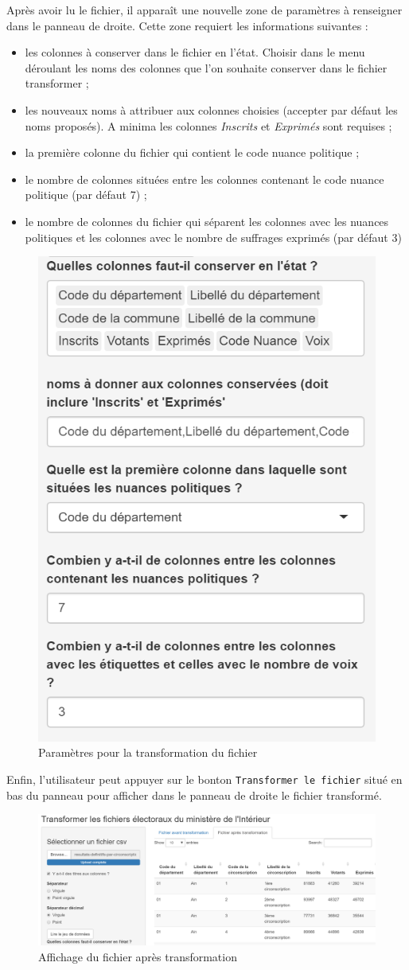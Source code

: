 \documentclass[
]{article}
\providecommand{\tightlist}{%
  \setlength{\itemsep}{0pt}\setlength{\parskip}{0pt}}
\begin{document}
Après avoir lu le fichier, il apparaît une nouvelle zone de paramètres à
renseigner dans le panneau de droite. Cette zone requiert les
informations suivantes :

\begin{itemize}
\tightlist
\item
  les colonnes à conserver dans le fichier en l'état. Choisir dans le
  menu déroulant les noms des colonnes que l'on souhaite conserver dans
  le fichier transformer ;
\item
  les nouveaux noms à attribuer aux colonnes choisies (accepter par
  défaut les noms proposés). A minima les colonnes \emph{Inscrits} et
  \emph{Exprimés} sont requises ;
\item
  la première colonne du fichier qui contient le code nuance politique ;
\item
  le nombre de colonnes situées entre les colonnes contenant le code
  nuance politique (par défaut 7) ;
\item
  le nombre de colonnes du fichier qui séparent les colonnes avec les
  nuances politiques et les colonnes avec le nombre de suffrages
  exprimés (par défaut 3)
\end{itemize}

\begin{figure}

{\centering \includegraphics[width=0.3\linewidth]{fig/avant_transformation} 

}

\caption{Paramètres pour la transformation du fichier}\label{fig:avant_transfo}
\end{figure}

Enfin, l'utilisateur peut appuyer sur le bonton
\texttt{Transformer\ le\ fichier} situé en bas du panneau pour afficher
dans le panneau de droite le fichier transformé.

\begin{figure}

{\centering \includegraphics[width=0.75\linewidth]{fig/apres_transformation} 

}

\caption{Affichage du fichier après transformation}\label{fig:apres_transfo}
\end{figure}
\end{document}
